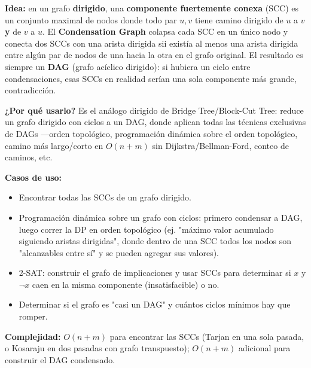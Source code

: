 \documentclass[10pt,a4paper,twocolumn]{article}
\begin{document}
\textbf{Idea:} en un grafo \textbf{dirigido}, una \textbf{componente
fuertemente conexa} (SCC) es un conjunto maximal de nodos donde todo
par $u, v$ tiene camino dirigido de $u$ a $v$ \textbf{y} de $v$ a
$u$. El \textbf{Condensation Graph} colapsa cada SCC en un único
nodo y conecta dos SCCs con una arista dirigida sii existía al menos
una arista dirigida entre algún par de nodos de una hacia la otra en
el grafo original. El resultado es siempre un \textbf{DAG} (grafo
acíclico dirigido): si hubiera un ciclo entre condensaciones, esas
SCCs en realidad serían una sola componente más grande, contradicción.

\textbf{¿Por qué usarlo?} Es el análogo dirigido de Bridge
Tree/Block-Cut Tree: reduce un grafo dirigido con ciclos a un DAG,
donde aplican todas las técnicas exclusivas de DAGs —orden
topológico, programación dinámica sobre el orden topológico, camino
más largo/corto en $O(n+m)$ sin Dijkstra/Bellman-Ford, conteo de
caminos, etc.

\textbf{Casos de uso:}

\begin{itemize}
    \item Encontrar todas las SCCs de un grafo dirigido.
    \item Programación dinámica sobre un grafo con ciclos: primero
    condensar a DAG, luego correr la DP en orden topológico (ej.
    "máximo valor acumulado siguiendo aristas dirigidas", donde
    dentro de una SCC todos los nodos son "alcanzables entre sí" y
    se pueden agregar sus valores).
    \item 2-SAT: construir el grafo de implicaciones y usar SCCs
    para determinar si $x$ y $\neg x$ caen en la misma componente
    (insatisfacible) o no.
    \item Determinar si el grafo es "casi un DAG" y cuántos ciclos
    mínimos hay que romper.
\end{itemize}

\textbf{Complejidad:} $O(n + m)$ para encontrar las SCCs (Tarjan en
una sola pasada, o Kosaraju en dos pasadas con grafo transpuesto);
$O(n + m)$ adicional para construir el DAG condensado.
\end{document}

